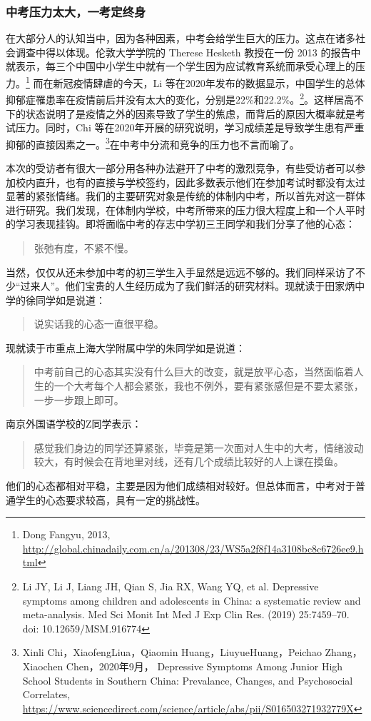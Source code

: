 \documentclass[12pt,UTF8]{ctexart}
\begin{document}
\subsubsection {中考压力太大，一考定终身}
\par {在大部分人的认知当中，因为各种因素，中考会给学生巨大的压力。这点在诸多社会调查中得以体现。伦敦大学学院的 Therese Hesketh 教授在一份
	2013 的报告中就表示，每三个中国中小学生中就有一个学生因为应试教育系统而承受心理上的压力。\footnote{Dong Fangyu, 2013,
		\url{http://global.chinadaily.com.cn/a/201308/23/WS5a2f8f14a3108bc8c6726ee9.html}}
	而在新冠疫情肆虐的今天，Li
	等在2020年发布的数据显示，中国学生的总体抑郁症罹患率在疫情前后并没有太大的变化，分别是22\%和22.2\%。\footnote{Li JY, Li J,
		Liang JH, Qian S, Jia RX, Wang YQ, et al. Depressive symptoms among children and
		adolescents in China: a systematic review and meta-analysis. Med Sci Monit Int
		Med J Exp Clin Res. (2019) 25:7459–70. doi:
		10.12659/MSM.916774}。这样居高不下的状态说明了是疫情之外的因素导致了学生的焦虑，而背后的原因大概率就是考试压力。同时，Chi 
	等在2020年开展的研究说明，学习成绩差是导致学生患有严重抑郁的直接因素之一。\footnote{Xinli Chi，XiaofengLiua，Qiaomin
		Huang，LiuyueHuang，Peichao Zhang，Xiaochen Chen，2020年9月， Depressive Symptoms Among
		Junior High School Students in Southern China: Prevalance, Changes, and
		Psychosocial Correlates,
		\url{https://www.sciencedirect.com/science/article/abs/pii/S016503271932779X}}在中考中分流和竞争的压力也不言而喻了。}
\par{
	
	本次的受访者有很大一部分用各种办法避开了中考的激烈竞争，有些受访者可以参加校内直升，也有的直接与学校签约，因此多数表示他们在参加考试时都没有太过显著的紧张情绪。我们的主要研究对象是传统的体制内中考，所以首先对这一群体进行研究。我们发现，在体制内学校，中考所带来的压力很大程度上和一个人平时的学习表现挂钩。即将面临中考的存志中学初三王同学和我们分享了他的心态：
	\begin{quote}
		\kaishu 张弛有度，不紧不慢。
	\end{quote}
	
	当然，仅仅从还未参加中考的初三学生入手显然是远远不够的。我们同样采访了不少“过来人”。他们宝贵的人生经历成为了我们鲜活的研究材料。现就读于田家炳中学的徐同学如是说道：
	\begin{quote}
		\kaishu 说实话我的心态一直很平稳。
	\end{quote}
	现就读于市重点上海大学附属中学的朱同学如是说道：
	\begin{quote}
		\kaishu
		中考前自己的心态其实没有什么巨大的改变，就是放平心态，当然面临着人生的一个大考每个人都会紧张，我也不例外，要有紧张感但是不要太紧张，一步一步跟上即可。
	\end{quote}
	南京外国语学校的Z同学表示：
	\begin{quote}
		\kaishu 感觉我们身边的同学还算紧张，毕竟是第一次面对人生中的大考，情绪波动较大，有时候会在背地里对线，还有几个成绩比较好的人上课在摸鱼。
	\end{quote}
	他们的心态都相对平稳，主要是因为他们成绩相对较好。但总体而言，中考对于普通学生的心态要求较高，具有一定的挑战性。
}
\end{document}

